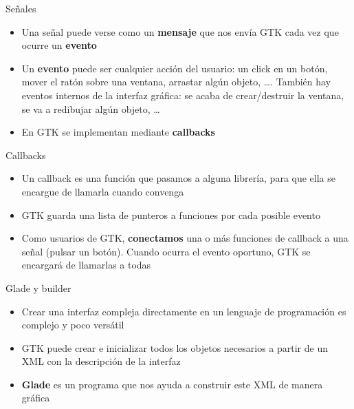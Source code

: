 \documentclass{mybeamer}
\begin{document}
\begin{framesec}{Señales}
	\begin{itemize}
		\item Una señal puede verse como un \textbf{mensaje} que nos
			envía GTK cada vez que ocurre un \textbf{evento}
		\item Un \textbf{evento} puede ser cualquier acción del usuario:
			un click en un botón, mover el ratón sobre una ventana,
			arrastar algún objeto, \ldots. También hay eventos
			internos de la interfaz gráfica: se acaba de
			crear/destruir la ventana, se va a redibujar algún
			objeto, \ldots
		\item En GTK se implementan mediante \textbf{callbacks}
	\end{itemize}
\end{framesec}

\begin{framesec}{Callbacks}
	\begin{itemize}
		\item Un callback es una función que pasamos a alguna librería,
			para que ella se encargue de llamarla cuando convenga
		\item GTK guarda una lista de punteros a funciones por cada
			posible evento
		\item Como usuarios de GTK, \textbf{conectamos} una o más
			funciones de callback a una señal (pulsar un botón).
			Cuando ocurra el evento oportuno, GTK se encargará de
			llamarlas a todas
	\end{itemize}
\end{framesec}

\begin{framesec}{Glade y builder}
	\begin{itemize}
		\item Crear una interfaz compleja directamente en un lenguaje de
			programación es complejo y poco versátil
		\item GTK puede crear e inicializar todos los objetos necesarios
			a partir de un XML con la descripción de la interfaz
		\item \textbf{Glade} es un programa que nos ayuda a construir
			este XML de manera gráfica
	\end{itemize}
	\vspace{1em}
\end{framesec}
\end{document}
